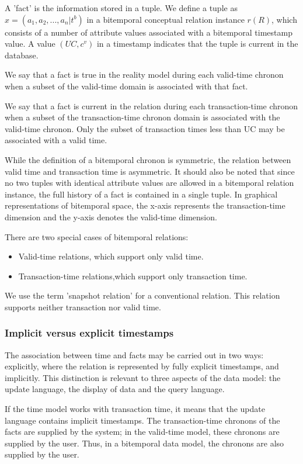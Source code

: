 A 'fact' is the information stored in a tuple. We define a tuple as $x=(a_1,a_2,...,a_n|t^b)$ in a bitemporal conceptual relation instance $r(R)$, which consists of a number of attribute values associated with a bitemporal timestamp value. A value $(UC,c^v)$ in a timestamp indicates that the tuple is current in the database.

We say that a fact is true in the reality model during each valid-time chronon when a subset of the valid-time domain is associated with that fact.

We say that a fact is current in the relation during each transaction-time chronon when a subset of the transaction-time chronon domain is associated with the valid-time chronon. Only the subset of transaction times less than UC may be associated with a valid time.

While the definition of a bitemporal chronon is symmetric, the relation between valid time and transaction time is asymmetric. It should also be noted that since no two tuples with identical attribute values are allowed in a bitemporal relation instance, the full history of a fact is contained in a single tuple. In graphical representations of bitemporal space, the x-axis represents the transaction-time dimension and the y-axis denotes the valid-time dimension.

There are two special cases of bitemporal relations:
\begin{itemize}
\item
Valid-time relations, which support only valid time.
\item
Transaction-time relations,which support only transaction time.
\end{itemize}
We use the term 'snapshot relation' for a conventional relation. This relation supports neither transaction nor valid time.
\subsubsection{Implicit versus explicit timestamps}
\label{sec:implicitversusexplicittimestamps}
The association between time and facts may be carried out in two ways: explicitly, where the relation is represented by fully explicit timestamps, and implicitly. This distinction is relevant to three aspects of the data model: the update language, the display of data and the query language.

	If the time model works with transaction time, it means that the update language contains implicit timestamps. The transaction-time chronons of the facts are supplied by the system; in the valid-time model, these chronons are supplied by the user. Thus, in a bitemporal data model, the chronons are also supplied by the user.

